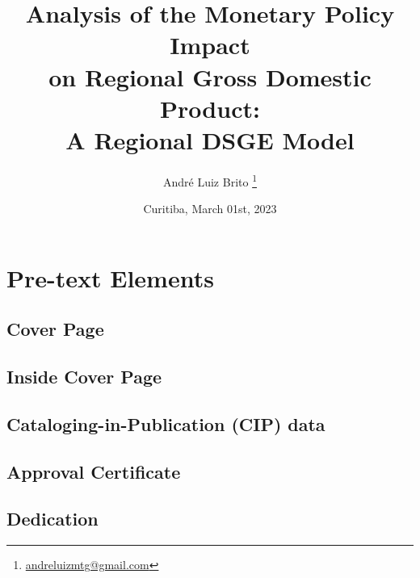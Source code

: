 \documentclass[
	12pt, 
	]{article}
\title{
	Analysis of the Monetary Policy Impact \\ 
	on Regional Gross Domestic Product: \\ 
	A Regional DSGE Model \vspace{2cm}}
\author{
	\LARGE André Luiz Brito 
	\footnote{ \href{ 
	mailto:andreluizmtg@gmail.com}{
	andreluizmtg@gmail.com}}}
\date{
	\vfill Curitiba, March 01st, 2023}
\numberwithin{equation}{section}
\theoremstyle{definition}
\theoremstyle{plain}
\theoremstyle{plain}
\theoremstyle{plain}
\begin{document}

\maketitle

\thispagestyle{empty}

\newpage


\section*{Pre-text Elements}

\subsection*{Cover Page}

\thispagestyle{empty}


\subsection*{Inside Cover Page}

\thispagestyle{empty}


\subsection*{Cataloging-in-Publication (CIP) data}

\thispagestyle{empty}


\subsection*{Approval Certificate}

\thispagestyle{empty}


\subsection*{Dedication}
\end{document}

